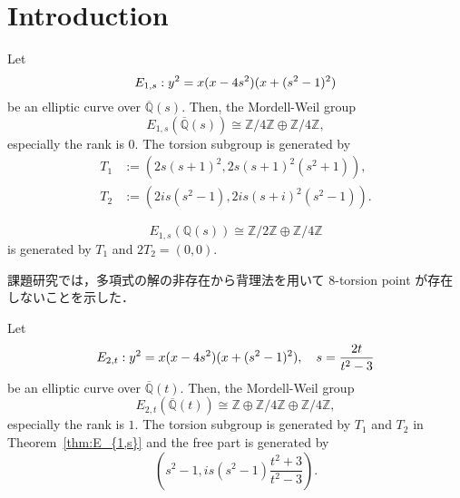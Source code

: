 \documentclass[main]{subfiles}
\begin{document}
\chapter{Introduction}

\begin{thm}
    \label{thm:E_{1,s}}
    Let
    \begin{equation}
        \label{eq:E_{1s}}
        E_{1,s}: y^{2} = x(x - 4s^{2})(x + (s^{2} - 1)^{2})
    \end{equation}
    be an elliptic curve over $\overline{\mathbb{Q}}(s)$.
    Then, the Mordell-Weil group
    \begin{equation}
        E_{1,s}(\overline{\mathbb{Q}}(s)) \cong \mathbb{Z} / 4 \mathbb{Z} \oplus \mathbb{Z} / 4 \mathbb{Z},
    \end{equation}
    especially the rank is $0$. The torsion subgroup is generated by
    \begin{align}
        T_1 & := (2s(s+1)^2, 2s(s+1)^2(s^2+1)),  \\
        T_2 & := (2is(s^2-1),2is(s+i)^2(s^2-1)).
    \end{align}
\end{thm}

\begin{cor}
    \begin{equation}
        E_{1,s}(\mathbb{Q}(s)) \cong \mathbb{Z} / 2 \mathbb{Z} \oplus \mathbb{Z} / 4 \mathbb{Z}
    \end{equation}
    is generated by $T_1$ and $2T_2=(0,0)$.
\end{cor}

\begin{rem}
    課題研究では，多項式の解の非存在から背理法を用いて 8-torsion point が存在しないことを示した．
\end{rem}

\begin{thm}
    \label{thm:E_{2,t}}
    Let
    \begin{equation}
        \label{eq:E_{4t}}
        E_{2,t}: y^{2} = x(x - 4s^{2})(x + (s^{2} - 1)^{2}),\quad s = \frac{2t}{t^{2} - 3}
    \end{equation}
    be an elliptic curve over $\overline{\mathbb{Q}}(t)$.
    Then, the Mordell-Weil group
    \begin{equation}
        E_{2,t}(\overline{\mathbb{Q}}(t)) \cong \mathbb{Z} \oplus \mathbb{Z} / 4 \mathbb{Z} \oplus \mathbb{Z} / 4 \mathbb{Z},
    \end{equation}
    especially the rank is $1$.
    The torsion subgroup is generated by $T_1$ and $T_2$ in Theorem~\ref{thm:E_{1,s}} and the free part is generated by
    \begin{equation}
        \left(s^{2} - 1, i s(s^{2} - 1) \frac{t^{2} + 3}{t^{2} - 3} \right).
    \end{equation}
\end{thm}
\end{document}
